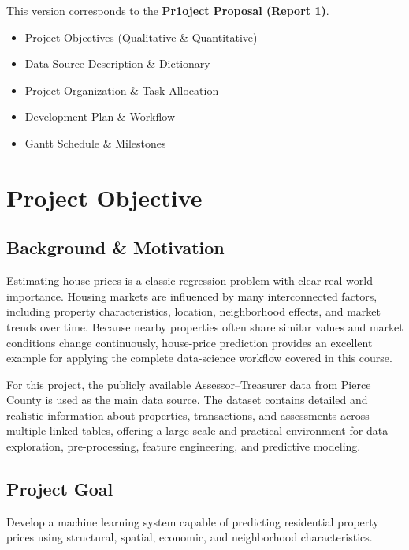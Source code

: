 \documentclass[
  english,
  letterpaper,
  DIV=11,
  numbers=noendperiod]{scrreprt}
\providecommand{\tightlist}{%
  \setlength{\itemsep}{0pt}\setlength{\parskip}{0pt}}
\begin{document}
This version corresponds to the \textbf{Pr1oject Proposal (Report 1)}.

\begin{itemize}
\tightlist
\item[$\boxtimes$]
  Project Objectives (Qualitative \& Quantitative)
\item[$\boxtimes$]
  Data Source Description \& Dictionary
\item[$\boxtimes$]
  Project Organization \& Task Allocation
\item[$\boxtimes$]
  Development Plan \& Workflow
\item[$\boxtimes$]
  Gantt Schedule \& Milestones
\end{itemize}


\chapter{Project Objective}\label{project-objective}

\section{Background \& Motivation}\label{background-motivation}

Estimating house prices is a classic regression problem with clear
real-world importance. Housing markets are influenced by many
interconnected factors, including property characteristics, location,
neighborhood effects, and market trends over time. Because nearby
properties often share similar values and market conditions change
continuously, house-price prediction provides an excellent example for
applying the complete data-science workflow covered in this course.

For this project, the publicly available Assessor--Treasurer data from
Pierce County is used as the main data source. The dataset contains
detailed and realistic information about properties, transactions, and
assessments across multiple linked tables, offering a large-scale and
practical environment for data exploration, pre-processing, feature
engineering, and predictive modeling.

\section{Project Goal}\label{project-goal}

Develop a machine learning system capable of predicting residential
property prices using structural, spatial, economic, and neighborhood
characteristics.
\end{document}
